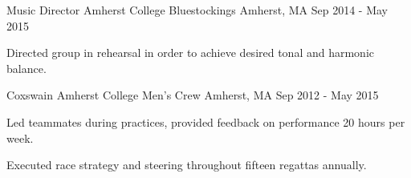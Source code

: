 

\begin{cventries}

  \cventry
    {Music Director} %
    {Amherst College Bluestockings} %
    {Amherst, MA} %
    {Sep 2014 - May 2015} %
    {
      \begin{cvitems} %
        \item {Directed group in rehearsal in order to achieve desired tonal and harmonic balance.}
      \end{cvitems}
    }
    
  \cventry
    {Coxswain} %
    {Amherst College Men's Crew} %
    {Amherst, MA} %
    {Sep 2012 - May 2015} %
    {
      \begin{cvitems} %
        \item {Led teammates during practices, provided feedback on performance 20 hours per week.}
        \item {Executed race strategy and steering throughout fifteen regattas annually.}        
      \end{cvitems}
    }    

\end{cventries}
